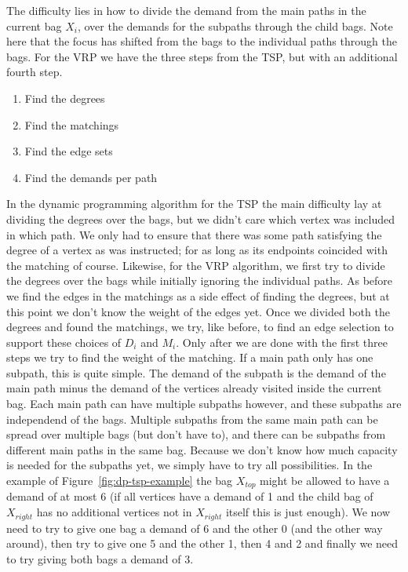 \documentclass[titlepage, 12pt]{article}
\begin{document}
    The difficulty lies in how to divide the demand from the main paths in the current bag $X_i$,
    over the demands for the subpaths through the child bags. Note here that the focus has shifted
    from the bags to the individual paths through the bags. For the VRP we have the three steps from
    the TSP, but with an additional fourth step.
    \begin{enumerate}
        \item Find the degrees
        \item Find the matchings
        \item Find the edge sets
        \item Find the demands per path
    \end{enumerate}
    In the dynamic programming algorithm for the TSP the main difficulty lay at dividing the degrees
    over the bags, but we didn't care which vertex was included in which path. We only had to ensure
    that there was some path satisfying the degree of a vertex as was instructed; for as long as its
    endpoints coincided with the matching of course.
    Likewise, for the VRP algorithm, we first try to divide the degrees over the bags while initially
    ignoring the individual paths. As before we find the edges in the matchings as a side effect of
    finding the degrees, but at this point we don't know the weight of the edges yet. Once we
    divided both the degrees and found the matchings, we try, like before, to find an edge selection
    to support these choices of $D_i$ and $M_i$.
    Only after we are done with the first three steps we try to find the weight of the matching. If a
    main path only has one subpath, this is quite simple. The demand of the subpath is the demand of
    the main path minus the demand of the vertices already visited inside the current bag.
    Each main path can have multiple subpaths however, and these subpaths are independend of the
    bags. Multiple subpaths from the same main path can be spread over multiple bags (but don't have
    to), and there can be subpaths from different main paths in the same bag.
    Because we don't know how much capacity is needed for the subpaths yet, we simply have to try
    all possibilities. In the example of Figure~\ref{fig:dp-tsp-example} the bag $X_{top}$ might
    be allowed to have a demand of at most 6 (if all vertices have a demand of 1 and the child bag
    of $X_{right}$ has no additional vertices not in $X_{right}$ itself this is just enough). We now
    need to try to give one bag a demand of 6 and the other 0 (and the other way around), then try
    to give one 5 and the other 1, then 4 and 2 and finally we need to try giving both bags a demand
    of 3.
\end{document}
